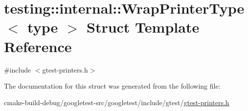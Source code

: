 \hypertarget{structtesting_1_1internal_1_1WrapPrinterType}{}\section{testing\+::internal\+::Wrap\+Printer\+Type$<$ type $>$ Struct Template Reference}
\label{structtesting_1_1internal_1_1WrapPrinterType}


{\ttfamily \#include $<$gtest-\/printers.\+h$>$}



The documentation for this struct was generated from the following file\+:\begin{DoxyCompactItemize}
\item 
cmake-\/build-\/debug/googletest-\/src/googletest/include/gtest/\mbox{\hyperlink{gtest-printers_8h}{gtest-\/printers.\+h}}\end{DoxyCompactItemize}
